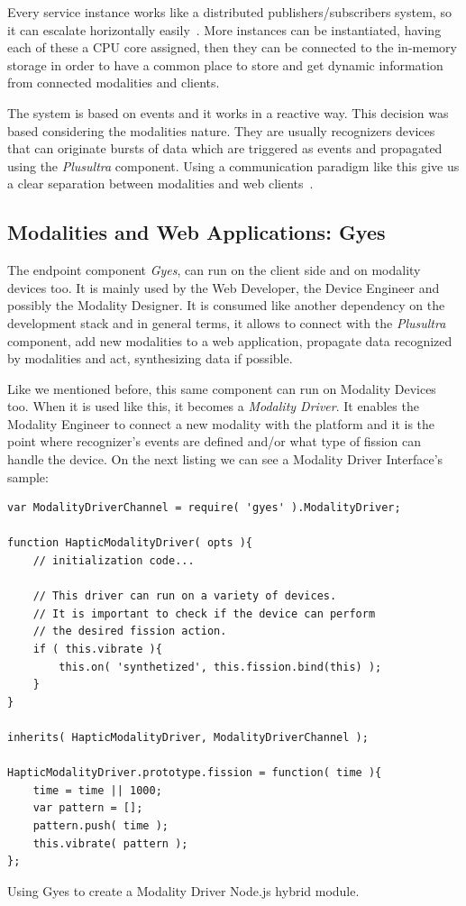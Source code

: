 \documentclass{llncs}
\begin{document}
Every service instance works like a distributed publishers/subscribers system, so it can escalate horizontally easily~\cite{Kermarrec2003}. More instances can be instantiated, having each of these a CPU core assigned, then they can be connected to the in-memory storage in order to have a common place to store and get dynamic information from connected modalities and clients.

The system is based on events and it works in a reactive way. This decision was based considering the modalities nature. They are usually recognizers devices that can originate bursts of data which are triggered as events and propagated using the \emph{Plusultra} component.
Using a communication paradigm like this give us a clear separation between modalities and web clients~\cite{Kermarrec2003}.

\subsection{Modalities and Web Applications: Gyes}

The endpoint component \emph{Gyes}, can run on the client side and on modality devices too. It is mainly used by the Web Developer, the Device Engineer and possibly the Modality Designer. It is consumed like another dependency on the development stack and in general terms, it allows to connect with the \emph{Plusultra} component, add new modalities to a web application, propagate data recognized by modalities and act, synthesizing data if possible. 

Like we mentioned before, this same component can run on Modality Devices too. When it is used like this, it becomes a \emph{Modality Driver}. It enables the Modality Engineer to connect a new modality with the platform and it is the point where recognizer's events are defined and/or what type of fission can handle the device. On the next listing we can see a Modality Driver Interface's sample:
\noindent
\begin{verbatim}
var ModalityDriverChannel = require( 'gyes' ).ModalityDriver; 

function HapticModalityDriver( opts ){
    // initialization code...
	
    // This driver can run on a variety of devices. 
    // It is important to check if the device can perform 
    // the desired fission action. 
    if ( this.vibrate ){
        this.on( 'synthetized', this.fission.bind(this) );
    }
}

inherits( HapticModalityDriver, ModalityDriverChannel );

HapticModalityDriver.prototype.fission = function( time ){
    time = time || 1000;
    var pattern = [];
    pattern.push( time );
    this.vibrate( pattern );
};
\end{verbatim}
\noindent
{\small Using Gyes to create a Modality Driver Node.js hybrid module.} 
\end{document}
